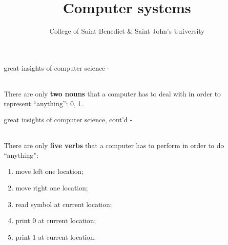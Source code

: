 \documentclass[10pt,t,svgnames]{beamer}
\title{Computer systems}
\date{}
\author{College of Saint Benedict \& Saint John's University}
\makeatletter
\newlength\tightleftmargin{}
\newlength\diffleftmargin{}
\providecommand{\nextline}{
  \setlength\labelwidth{\tightleftmargin}
  \setlength\leftmargin{\tightleftmargin}
  \advance\linewidth\diffleftmargin{}
  \advance\@totalleftmargin-\diffleftmargin{}
  \parshape\@ne\@totalleftmargin\linewidth{}
  \setlength\itemsep{1.5ex}
}
\let\origdescription\description
\let\endorigdescription\enddescription
\renewenvironment{description}{\origdescription\nextline}{\endorigdescription}
\makeatother
\begin{document}
  \maketitle

  \begin{frame}[c]{great insights of computer science\footnotemark}
    \begin{description}
      \item[Bacon, Leibniz, Boole, Turing, Shannon, \& Morse] \hfill \\
        There are only \textbf{two nouns} that a computer has to deal with in
        order to represent ``anything'': 0, 1.
    \end{description}


  \end{frame}

  \begin{frame}[c]{great insights of computer science, cont'd}
    \begin{description}
      \item[Turing] \hfill \\
        There are only \textbf{five verbs} that a computer has to perform in
        order to do ``anything'':
        \begin{enumerate}
          \item move left one location;
          \item move right one location;
          \item read symbol at current location;
          \item print 0 at current location;
          \item print 1 at current location.
        \end{enumerate}
    \end{description}
  \end{frame}
\end{document}

